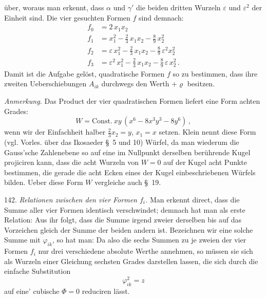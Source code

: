 über, woraus man erkennt, dass $\alpha$ und $\gamma'$ die beiden dritten Wurzeln $\varepsilon$ und $\varepsilon^2$ der Einheit sind. Die vier gesuchten Formen $f$ sind demnach:
\[
\begin{aligned}
f_0 &= 2\,x_1x_2\\
f_1 &= x_1^2 - \frac{2}{3}\,x_1x_2 - \frac{8}{9}\,x_2^2\\
f_2 &= \varepsilon\,x_1^2 - \frac{2}{3}\,x_1x_2 - \frac{8}{9}\,\varepsilon^2 x_2^2\\
f_3 &= \varepsilon^2\,x_1^2 - \frac{2}{3}\,x_1x_2 - \frac{8}{9}\,\varepsilon\,x_2^2\,.
\end{aligned}
\]
Damit ist die Aufgabe gelöst, quadratische Formen $f$ so zu bestimmen, dass ihre zweiten Ueberschiebungen $A_{ik}$ durchwegs den Werth $+\varrho$ besitzen.

\textit{Anmerkung.} Das Product der vier quadratischen Formen liefert eine Form achten Grades:
\[
W = \text{Const.}\ xy\,(x^6 - 8x^3y^3 - 8y^6)\,,
\]
wenn wir der Einfachheit halber $\frac{2}{3}x_2=y$, $x_1=x$ setzen. Klein nennt diese Form (vgl. Vorles. über das Ikosaeder \S~5 und 10) Würfel, da man wiederum die Gauss'sche Zahlenebene so auf eine im Nullpunkt derselben berührende Kugel projiciren kann, dass die acht Wurzeln von $W=0$ auf der Kugel acht Punkte bestimmen, die gerade die acht Ecken eines der Kugel einbeschriebenen Würfels bilden. Ueber diese Form $W$ vergleiche auch \S~19.

142. \textit{Relationen zwischen den vier Formen $f_i$.} Man erkennt direct, dass die Summe aller vier Formen identisch verschwindet; demnach hat man als erste Relation:
Aus ihr folgt, dass die Summe irgend zweier derselben bis auf das Vorzeichen gleich der Summe der beiden andern ist. Bezeichnen wir eine solche Summe mit $\varphi_{ik}$, so hat man:
Da also die sechs Summen zu je zweien der vier Formen $f_i$ nur drei verschiedene absolute Werthe annehmen, so müssen sie sich als Wurzeln einer Gleichung sechsten Grades darstellen lassen, die sich durch die einfache Substitution
\[
\varphi_{ik}^2 = z
\]
auf eine' cubische $\Phi=0$ reduciren lässt. %


